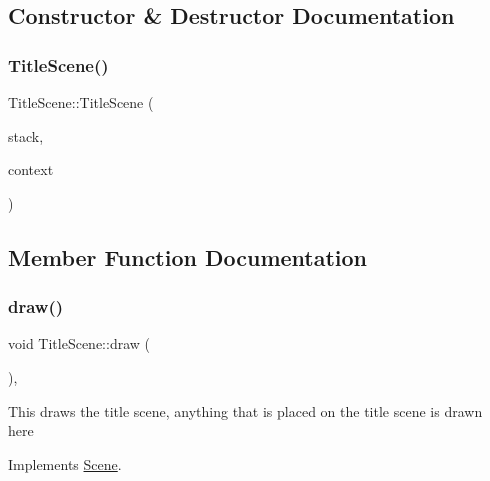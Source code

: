 \subsection{Constructor \& Destructor Documentation}
\mbox{\label{class_title_scene_a280a3b1e5890f45b932860777f8fbe6d}} 
\subsubsection{\texorpdfstring{Title\+Scene()}{TitleScene()}}
{\footnotesize\ttfamily Title\+Scene\+::\+Title\+Scene (\begin{DoxyParamCaption}\item[{\hyperlink{class_scene_stack}{Scene\+Stack} \&}]{stack,  }\item[{\hyperlink{struct_scene_1_1_context}{Context}}]{context }\end{DoxyParamCaption})}



\subsection{Member Function Documentation}
\mbox{\label{class_title_scene_a3e527255771f75a41c4fe8aaa35999dd}} 
\subsubsection{\texorpdfstring{draw()}{draw()}}
{\footnotesize\ttfamily void Title\+Scene\+::draw (\begin{DoxyParamCaption}{ }\end{DoxyParamCaption})\hspace{0.3cm}{\ttfamily [override]}, {\ttfamily [virtual]}}

This draws the title scene, anything that is placed on the title scene is drawn here 

Implements \hyperlink{class_scene_a789c16961aa1e316b2a4a05b95187546}{Scene}.

\mbox{\label{class_title_scene_a1f019a83309ce967883b4b4d76b816af}} 
